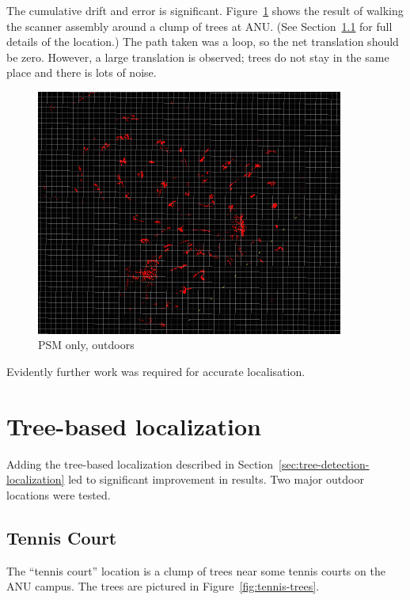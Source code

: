 \documentclass[12pt,oneside,a4paper]{book}
\begin{document}
The cumulative drift and error is
significant. Figure~\ref{fig:psm-outdoor} shows the result of walking
the scanner assembly around a clump of trees at ANU. (See
Section~\ref{sec:tennis-court} for full details of the location.) The
path taken was a loop, so the net translation should be zero. However, a
large translation is observed; trees do not stay in the same place and
there is lots of noise.

\begin{figure}
  \centering
  \includegraphics[width=0.9\textwidth]{figs/psm-outdoor}
  \caption{PSM only, outdoors}
  \label{fig:psm-outdoor}
\end{figure}

Evidently further work was required for accurate localisation.
\newpage~\newpage
\section{Tree-based localization}
\label{sec:tree-based-local}

Adding the tree-based localization described in
Section~\ref{sec:tree-detection-localization} led to significant
improvement in results. Two major outdoor locations were tested.

\subsection{Tennis Court}
\label{sec:tennis-court}

The ``tennis court'' location is a clump of trees near some tennis
courts on the ANU campus. The trees are pictured in
Figure~\ref{fig:tennis-trees}.
\end{document}
